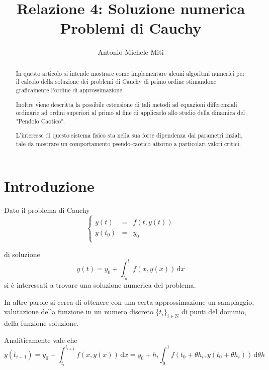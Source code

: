 \documentclass[11pt]{article}
\title{Relazione 4: Soluzione numerica Problemi di Cauchy}
\author{Antonio Michele Miti}
\begin{document}
\maketitle
\begin{abstract}
In questo articolo si intende mostrare come implementare alcuni algoritmi numerici per il calcolo della soluzione dei problemi di Cauchy di primo ordine stimandone graficamente l'ordine di approssimazione.

Inoltre viene descritta la possibile estensione di tali metodi ad equazioni differenziali ordinarie ad ordini superiori al primo al fine di applicarlo allo studio della dinamica del "Pendolo Caotico".

L'interesse di questo sistema fisico sta nella sua forte dipendenza dai parametri inziali, tale da mostrare un comportamento pseudo-caotico attorno a particolari valori critici.
\end{abstract}



\section{Introduzione}

Dato il problema di Cauchy
	\begin{equation}
	\left\{ 
			\begin{array}{rcl}
 			\dot{y(t)} &=& f(t,y(t))\\
 			y(t_{0}) &=& y_{0} \\
  			\end{array} \right.
	\end{equation}

di soluzione
	\begin{equation}
	y(t)=y_{0}+\int_{t_{0}}^{t}f(x,y(x)) \, \textrm{d} x
	\end{equation}
si è interessati a trovare una soluzione numerica del problema.

In altre parole si cerca di ottenere con una certa approssimazione un samplaggio, valutazione della funzione in un numero discreto $\{ t_{i}\} _{i\in \textrm{N}}$ di punti del dominio, della funzione soluzione.

Analiticamente vale che
	\begin{equation}
		y(t_{i+1})=y_{0}+\int_{t_{i}}^{t_{i+1}}f(x,y(x)) \, \textrm{d} x 
		=y_{0} + h_{i}\int_{0}^{1}f(t_{0}+\theta h_{i}, y(t_{0}+\theta h_{i})) \, \textrm{d} \theta h
	\end{equation}
\end{document}
